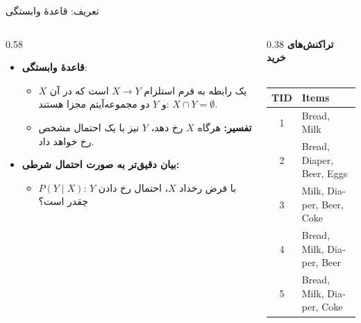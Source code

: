 \begin{frame}{تعریف: قاعدهٔ وابستگی}{}
\begin{columns}[T,onlytextwidth]
\begin{column}{0.58\textwidth}
\begin{itemize}\setlength{\itemsep}{6pt}
    \item \textbf{قاعدهٔ وابستگی}: 
    \begin{itemize}\setlength{\itemsep}{3pt}
        \item یک رابطه به فرم استلزام $X \to Y$ است که در آن $X$ و $Y$ دو مجموعه‌آیتم مجزا هستند: $X \cap Y = \emptyset$.
        \item \textbf{تفسیر:} هرگاه $X$ رخ دهد، $Y$ نیز با یک احتمال مشخص رخ خواهد داد.
    \end{itemize}
    \vspace{0.2cm}
    \item \textbf{بیان دقیق‌تر به صورت احتمال شرطی:}
    \begin{itemize}\setlength{\itemsep}{3pt}
        \item $P(Y \mid X)$: با فرض رخداد $X$، احتمال رخ دادن $Y$ چقدر است؟
    \end{itemize}
\end{itemize}
\end{column}%
\begin{column}{0.38\textwidth}
\centering
\textbf{\small تراکنش‌های خرید}\\[1pt]
{\scriptsize{}}\\[3pt]
\begin{latin}
\fontsize{7.5}{9.5}\selectfont
\begin{tabular}{|c|l|}
\hline
\rowcolor{mannheimblue!15}
\textbf{TID} & \textbf{Items} \\ \hline
1 & Bread, Milk \\ \hline
2 & Bread, Diaper, Beer, Eggs \\ \hline
3 & Milk, Diaper, Beer, Coke \\ \hline
4 & Bread, Milk, Diaper, Beer \\ \hline
5 & Bread, Milk, Diaper, Coke \\ \hline
\end{tabular}
\end{latin}
\end{column}
\end{columns}
\end{frame}

